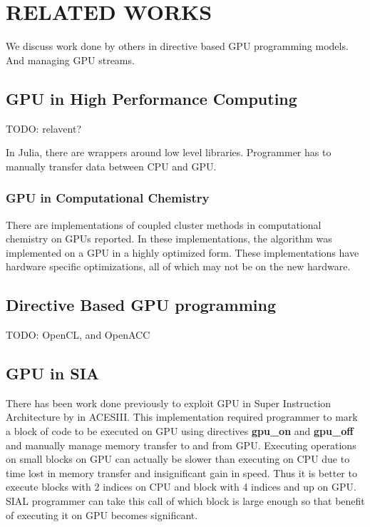 \chapter{RELATED WORKS} \label{lit}

We discuss work done by others in directive based GPU programming models. And
managing GPU streams.

\section{GPU in High Performance Computing}

TODO: relavent?

In Julia, there are wrappers around low level libraries. Programmer has to
manually transfer data between CPU and GPU.

\subsection{GPU in Computational Chemistry}

There are implementations of coupled cluster methods in computational chemistry
on GPUs reported. In these implementations, the algorithm was implemented on a
GPU in a highly optimized form. These implementations have hardware specific
optimizations, all of which may not be on the new hardware.

\section{Directive Based GPU programming}

TODO: OpenCL, and OpenACC

\section{GPU in SIA}

There has been work done previously to exploit GPU in Super Instruction
Architecture by \cite{jindal2016gpusial} in ACESIII. This implementation
required programmer to mark a block of code to be executed on GPU using
directives \textbf{gpu\_on} and \textbf{gpu\_off} and manually manage memory
transfer to and from GPU. Executing operations on small blocks on GPU can
actually be slower than executing on CPU due to time lost in memory transfer and
insignificant gain in speed. Thus it is better to execute blocks with 2 indices
on CPU and block with 4 indices and up on GPU. SIAL programmer can take this
call of which block is large enough so that benefit of executing it on GPU
becomes significant.


